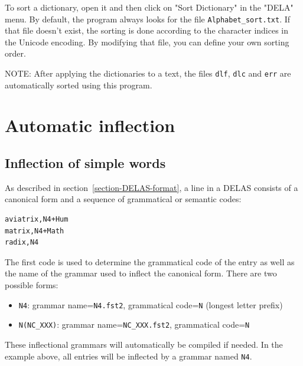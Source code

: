 \bigskip
\noindent To sort a dictionary, open it and then click on "Sort Dictionary" in
 the "DELA" menu. By default, the program always looks for the file
\verb+Alphabet_sort.txt+. If that file doesn't exist, the sorting is done
according to the character indices in the Unicode encoding. By modifying that
file, you can define your own sorting order.

\bigskip
\noindent NOTE: After applying the dictionaries to a text, the files
\verb+dlf+, \verb+dlc+ and \verb+err+ are automatically sorted using this
program.  



\section{Automatic inflection}
\label{section-automatic-inflection}
\subsection{Inflection of simple words}

As described in section~\ref{section-DELAS-format}, a line in a DELAS
consists of a canonical form and a sequence of grammatical or semantic codes:

\begin{verbatim}
aviatrix,N4+Hum
matrix,N4+Math
radix,N4
\end{verbatim}

\bigskip
\noindent The first code is used to determine the grammatical code of the entry as
well as the name of the grammar used to inflect the canonical form. There are
two possible forms:

\begin{itemize}
  \item \verb+N4+: grammar name=\verb+N4.fst2+, grammatical code=\verb+N+
  (longest letter prefix)
  \item \verb+N(NC_XXX)+: grammar name=\verb+NC_XXX.fst2+, grammatical code=\verb+N+
\end{itemize}

\bigskip
\noindent These inflectional grammars 
will automatically be
compiled if needed. In the example above, all entries will be inflected by a grammar named \verb+N4+.

